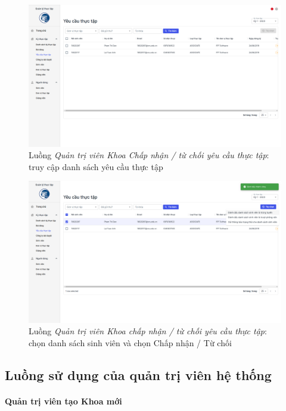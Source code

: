 \documentclass[./../main.tex]{subfiles}
\begin{document}
\begin{figure}[]
	\includegraphics[width=\linewidth]{./images/image72.png}
	\caption{Luồng \emph{Quản trị viên Khoa Chấp nhận / từ chối yêu cầu thực tập}: truy cập danh sách yêu cầu thực tập}
	\label{fig:org_admin_access_list_requests}
\end{figure}

\begin{figure}[]
	\includegraphics[width=\linewidth]{./images/image73.png}
	\caption{Luồng \emph{Quản trị viên Khoa chấp nhận / từ chối yêu cầu thực tập}: chọn danh sách sinh viên và chọn Chấp nhận / Từ chối}
	\label{fig:org_admin_select_requests}
\end{figure}

\subsection{Luồng sử dụng của quản trị viên hệ thống}

\paragraph*{Quản trị viên tạo Khoa mới}
\end{document}
